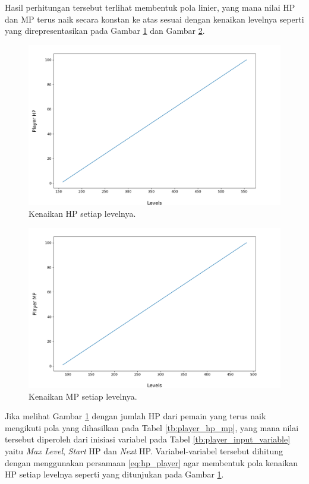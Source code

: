 Hasil perhitungan tersebut terlihat membentuk pola linier, yang mana nilai HP dan MP terus naik secara konstan ke atas sesuai dengan kenaikan levelnya seperti yang direpresentasikan pada Gambar \ref{fig:hp_player} dan Gambar \ref{fig:mp_player}.
\vspace{1ex}

\begin{figure} [!h] \centering
	\includegraphics[scale=0.5]{img/PlayerHpDistrib.png}
	\caption{Kenaikan HP setiap levelnya.}
	\vspace{1ex}
	\label{fig:hp_player}
\end{figure}

\begin{figure} [!h] \centering
	\includegraphics[scale=0.5]{img/PlayerMpDistrib.png}
	\caption{Kenaikan MP setiap levelnya.}
	\label{fig:mp_player}
\end{figure}

Jika melihat Gambar \ref{fig:hp_player} dengan jumlah HP dari pemain yang terus naik mengikuti pola yang dihasilkan pada Tabel \ref{tb:player_hp_mp}, yang mana nilai tersebut diperoleh dari inisiasi variabel pada Tabel \ref{tb:player_input_variable} yaitu \textit{Max Level}, \textit{Start} HP dan \textit{Next} HP. Variabel-variabel tersebut dihitung dengan menggunakan persamaan \ref{eq:hp_player} agar membentuk pola kenaikan HP setiap levelnya seperti yang ditunjukan pada Gambar \ref{fig:hp_player}.
\vspace{1ex}

